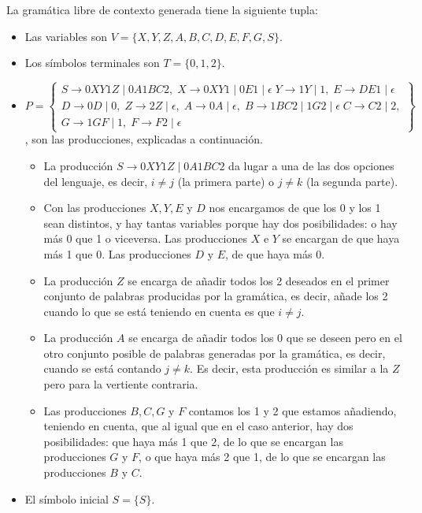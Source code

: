 \documentclass[11pt,a4paper]{article}
\begin{document}
La gramática libre de contexto generada tiene la siguiente tupla:
	\begin{itemize}
		\item Las variables son $V=\{X,Y,Z,A,B,C,D,E,F,G,S\}$.
		\item Los símbolos terminales son $T=\{0,1,2\}$.
		\item $P=\left\{\begin{array}{c}
			S\rightarrow 0XY1Z \mid 0A1BC2, \; 
			X\rightarrow 0XY1 \mid 0E1 \mid \epsilon \; 
			Y\rightarrow 1Y \mid 1, \; 
			E\rightarrow DE1 \mid \epsilon \\
			D\rightarrow 0D \mid 0, \;
			Z\rightarrow 2Z \mid \epsilon, \;
			A\rightarrow 0A \mid \epsilon, \;
			B\rightarrow 1BC2 \mid 1G2 \mid \epsilon \;
			C\rightarrow C2 \mid 2, \\
			G\rightarrow 1GF \mid 1, \;
			F\rightarrow F2 \mid \epsilon
		\end{array}\right\}$, son las producciones, explicadas a continuación.
		\begin{itemize}
			\item La producción $S\rightarrow 0XY1Z \mid 0A1BC2$ da lugar a una de las dos opciones del lenguaje, es decir, $i\not = j$ (la primera parte) o $j\not = k$ (la segunda parte).
			\item Con las producciones $X, Y, E$ y $D$ nos encargamos de que los 0 y los 1 sean distintos, y hay tantas variables porque hay dos posibilidades: o hay más 0 que 1 o viceversa. Las producciones $X$ e $Y$ se encargan de que haya más 1 que 0. Las producciones $D$ y $E$, de que haya más 0.
			\item La producción $Z$ se encarga de añadir todos los 2 deseados en el primer conjunto de palabras producidas por la gramática, es decir, añade los 2 cuando lo que se está teniendo en cuenta es que $i \not = j$.
			\item La producción $A$ se encarga de añadir todos los 0 que se deseen pero en el otro conjunto posible de palabras generadas por la gramática, es decir, cuando se está contando $j\not = k$. Es decir, esta producción es similar a la $Z$ pero para la vertiente contraria.
			\item Las producciones $B, C, G$ y $F$ contamos los 1 y 2 que estamos añadiendo, teniendo en cuenta, que al igual que en el caso anterior, hay dos posibilidades: que haya más 1 que 2, de lo que se encargan las producciones $G$ y $F$, o que haya más 2 que 1, de lo que se encargan las producciones $B$ y $C$.
		\end{itemize}
		\item El símbolo inicial $S=\{S\}$.
	\end{itemize}
\end{document}
